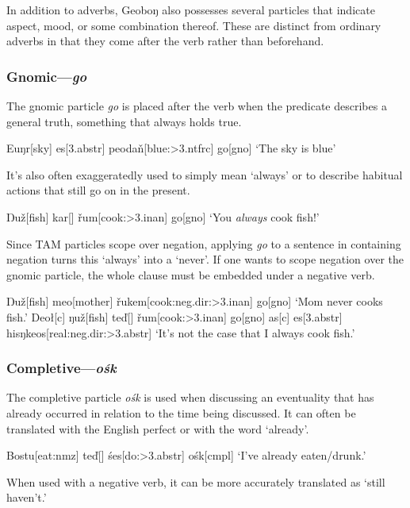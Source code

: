 \documentclass[a4paper,11pt,oneside,openany]{memoir}
\newcommand{\vd}{ď}
\newcommand{\vz}{ž}
\newcommand{\vr}{ř}
\newcommand{\vn}{ň}
\newcommand{\Engma}{Ŋ}
\newcommand{\engma}{ŋ}
\begin{document}
In addition to adverbs, Geobo{\engma} also possesses several particles that indicate aspect, mood, or some combination thereof. These are distinct from ordinary adverbs in that they come after the verb rather than beforehand.

\subsubsection{Gnomic---\textit{go}}

The gnomic particle \textit{go} is placed after the verb when the predicate describes a general truth, something that always holds true.

\ex
\begingl
Eu\engma r[sky]
es[\sc 3.abstr]
peoda\vn[blue:{\sc >3.ntfrc}]
go[\sc gno]
\glft `The sky is blue'
\endgl
\xe

It's also often exaggeratedly used to simply mean `always' or to describe habitual actions that still go on in the present.

\ex 
\begingl
\Engma u\vz[fish]
kar[]
\vr um[cook:{\sc >3.inan}]
go[\sc gno]
\nogloss{!}
\glft `You \emph{always} cook fish!'
\endgl
\xe

Since TAM particles scope over negation, applying \textit{go} to a sentence in containing negation turns this `always' into a `never'. If one wants to scope negation over the gnomic particle, the whole clause must be embedded under a negative verb.

\pex 
\a 
\begingl
\Engma u\vz[fish]
meo[mother]
\vr ukem[cook:{\sc neg.dir:>3.inan}]
go[\sc gno]
\glft `Mom never cooks fish.'
\endgl
\a 
\begingl
Deo\l[\sc c]
\engma u\vz[fish]
te\vd[]
\vr um[cook:{\sc >3.inan}]
go[\sc gno]
\nogloss{,}
as[\sc c]
es[\sc 3.abstr]
his\engma keos[real:{\sc neg.dir:>3.abstr}]
\glft `It's not the case that I always cook fish.'
\endgl
\xe

\subsubsection{Completive---\textit{o\'sk}}

The completive particle \textit{o\'sk} is used when discussing an eventuality that has already occurred in relation to the time being discussed. It can often be translated with the English perfect or with the word `already'.

\ex 
\begingl
Bostu[eat:{\sc nmz}]
te\vd[]
\'ses[do:{\sc >3.abstr}]
o\'sk[\sc cmpl]
\glft `I've already eaten/drunk.'
\endgl
\xe

When used with a negative verb, it can be more accurately translated as `still haven't.'
\end{document}

